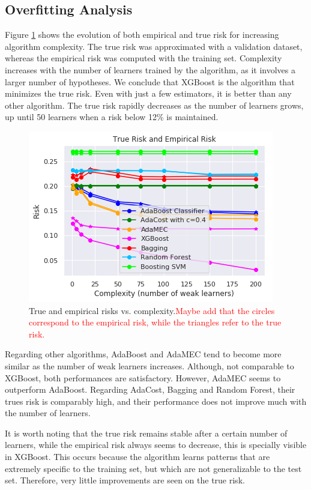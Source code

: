 \documentclass[conference]{IEEEtran}
\begin{document}
\subsection{Overfitting Analysis}

Figure \ref{fig:True_empirical_risk_complexity} shows the evolution of both empirical and true risk for increasing algorithm complexity. The true risk was approximated with a validation dataset, whereas the empirical risk was computed with the training set. Complexity increases with the number of learners trained by the algorithm, as it involves a larger number of hypotheses. We conclude that XGBoost is the algorithm that minimizes the true risk. Even with just a few estimators, it is better than any other algorithm. The true risk rapidly decreases as the number of learners grows, up until 50 learners when a risk below 12\% is maintained.

\begin{figure}
	\includegraphics[scale=0.55]{True_empirical_risk_complexity}
	\centering
	\caption{True and empirical risks vs. complexity.\textcolor{red}{Maybe add that the circles correspond to the empirical risk, while the triangles refer to the true risk.}}
	\label{fig:True_empirical_risk_complexity}
\end{figure}

Regarding other algorithms, AdaBoost and AdaMEC tend to become more similar as the number of weak learners increases. Although, not comparable to XGBoost, both performances are satisfactory. However, AdaMEC seems to outperform AdaBoost. Regarding AdaCost, Bagging and Random Forest, their trues risk is comparably high, and their performance does not improve much with the number of learners.

It is worth noting that the true risk remains stable after a certain number of learners, while the empirical risk always seems to decrease, this is specially visible in XGBoost. This occurs because the algorithm learns patterns that are extremely specific to the training set, but which are not generalizable to the test set. Therefore, very little improvements are seen on the true risk. %
\end{document}
